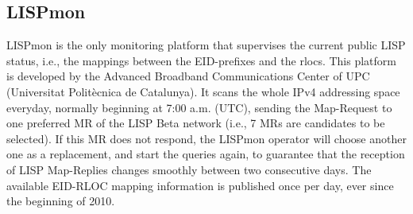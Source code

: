 \subsection{LISPmon}
\label{subsec:monitor_LISPmon}

LISPmon is the only monitoring platform that supervises the current public LISP status, i.e., the mappings between the EID-prefixes and the \acrshort{rloc}s. This platform is developed by the Advanced Broadband Communications Center of UPC (Universitat Politècnica de Catalunya). It scans the whole IPv4 addressing space everyday, normally beginning at 7:00 a.m. (UTC), sending the Map-Request to one preferred MR of the LISP Beta network (i.e., 7 MRs are candidates to be selected). If this MR does not respond, the LISPmon operator will choose another one as a replacement, and start the queries again, to guarantee that the reception of LISP Map-Replies changes smoothly %
between two consecutive days. The available EID-RLOC mapping information is published once per day, ever since the beginning of 2010.

